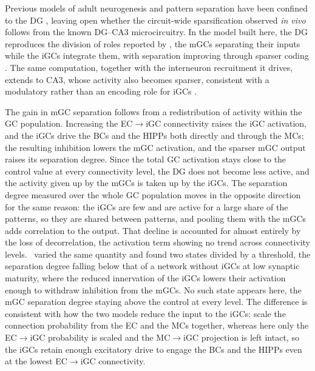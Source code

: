\documentclass[pdflatex,sn-basic]{sn-jnl}%
\theoremstyle{thmstyleone}%
\theoremstyle{thmstyletwo}%
\theoremstyle{thmstylethree}%
\begin{document}
Previous models of adult neurogenesis and pattern separation have been confined to the DG \citep{chavlisDendrites2017,
kimEffect2024, yangDynamic2025}, leaving open whether the circuit-wide sparsification observed \textit{in vivo}
\citep{mchughAdultborn2022} follows from the known DG--CA3 microcircuitry. In the  model built here, the DG reproduces the
division of roles reported by \citet{kimEffect2024}, the mGCs separating their inputs while the iGCs integrate them, with
separation improving through sparser coding \citep{chavlisDendrites2017}. The same computation, together with the interneuron
recruitment it drives, extends to CA3, whose activity also becomes sparser, consistent with a modulatory rather than an encoding
role for iGCs \citep{mchughAdultborn2022, folszAdultborn2023}.


The gain in mGC separation follows from a redistribution of activity within the GC population. Increasing the EC$\to$iGC
connectivity raises the iGC activation, and the iGCs drive the BCs and the HIPPs both directly and through the MCs; the resulting
inhibition lowers the mGC activation, and the sparser mGC output raises its separation degree. Since the total GC activation stays
close to the control value at every connectivity level, the DG does not become less active, and the activity given up by the mGCs
is taken up by the iGCs. The separation degree measured over the whole GC population moves in the opposite direction for the same
reason: the iGCs are few and are active for a large share of the patterns, so they are shared between patterns, and pooling them
with the mGCs adds correlation to the output. That decline is accounted for almost entirely by the loss of decorrelation, the
activation term showing no trend across connectivity levels.\ \citet{kimEffect2024} varied the same quantity and found two states
divided by a threshold, the separation degree falling below that of a network without iGCs at low synaptic maturity, where the
reduced innervation of the iGCs lowers their activation enough to withdraw inhibition from the mGCs. No such state appears here,
the mGC separation degree staying above the control at every level. The difference is consistent with how the two models
reduce the input to the iGCs: \citet{kimEffect2024} scale the connection probability from the EC and the MCs together, whereas
here only the EC$\to$iGC probability is scaled and the MC$\to$iGC projection is left intact, so the iGCs retain enough excitatory
drive to engage the BCs and the HIPPs even at the lowest EC$\to$iGC connectivity.
\end{document}
